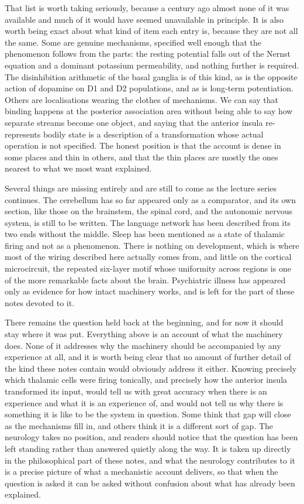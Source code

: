 \documentclass[11pt]{article}
\begin{document}
That list is worth taking seriously, because a century ago almost none of it was available and much of it would have seemed unavailable in principle. It is also worth being exact about what kind of item each entry is, because they are not all the same. Some are genuine mechanisms, specified well enough that the phenomenon follows from the parts: the resting potential falls out of the Nernst equation and a dominant potassium permeability, and nothing further is required. The disinhibition arithmetic of the basal ganglia is of this kind, as is the opposite action of dopamine on D1 and D2 populations, and as is long-term potentiation. Others are localisations wearing the clothes of mechanisms. We can say that binding happens at the posterior association area without being able to say how separate streams become one object, and saying that the anterior insula re-represents bodily state is a description of a transformation whose actual operation is not specified. The honest position is that the account is dense in some places and thin in others, and that the thin places are mostly the ones nearest to what we most want explained.

Several things are missing entirely and are still to come as the lecture series continues. The cerebellum has so far appeared only as a comparator, and its own section, like those on the brainstem, the spinal cord, and the autonomic nervous system, is still to be written. The language network has been described from its two ends without the middle. Sleep has been mentioned as a state of thalamic firing and not as a phenomenon. There is nothing on development, which is where most of the wiring described here actually comes from, and little on the cortical microcircuit, the repeated six-layer motif whose uniformity across regions is one of the more remarkable facts about the brain. Psychiatric illness has appeared only as evidence for how intact machinery works, and is left for the part of these notes devoted to it.

There remains the question held back at the beginning, and for now it should stay where it was put. Everything above is an account of what the machinery does. None of it addresses why the machinery should be accompanied by any experience at all, and it is worth being clear that no amount of further detail of the kind these notes contain would obviously address it either. Knowing precisely which thalamic cells were firing tonically, and precisely how the anterior insula transformed its input, would tell us with great accuracy when there is an experience and what it is an experience of, and would not tell us why there is something it is like to be the system in question. Some think that gap will close as the mechanisms fill in, and others think it is a different sort of gap. The neurology takes no position, and readers should notice that the question has been left standing rather than answered quietly along the way. It is taken up directly in the philosophical part of these notes, and what the neurology contributes to it is a precise picture of what a mechanistic account delivers, so that when the question is asked it can be asked without confusion about what has already been explained.
\end{document}
